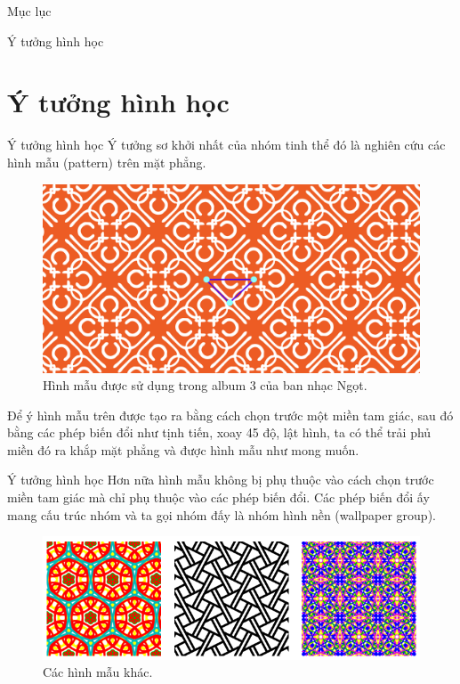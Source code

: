 


\begin{frame}
    \titlepage
\end{frame}

\begin{frame}{Mục lục}
    \tableofcontents
\end{frame}

\begin{frame}{Ý tưởng hình học}
    \section{Ý tưởng hình học}
\end{frame}

\begin{frame}{Ý tưởng hình học}
    Ý tưởng sơ khởi nhất của nhóm tinh thể đó là nghiên cứu các hình mẫu (pattern) trên mặt phẳng.

    \begin{figure}[ht]
        \centering
        \includegraphics[scale=0.3]{assets/ngot-band-pattern.png}
        \caption{Hình mẫu được sử dụng trong album 3 của ban nhạc Ngọt.}
        \label{fig:ngot-album-pattern}
    \end{figure}
    Để ý hình mẫu trên được tạo ra bằng cách chọn trước một miền tam giác, sau đó bằng các phép biến đổi như tịnh tiến, xoay 45 độ, lật hình, ta có thể trải phủ miền đó ra khắp mặt phẳng và được hình mẫu như mong muốn.
\end{frame}

\begin{frame}{Ý tưởng hình học}
    Hơn nữa hình mẫu không bị phụ thuộc vào cách chọn trước miền tam giác mà chỉ phụ thuộc vào các phép biến đổi. Các phép biến đổi ấy mang cấu trúc nhóm và ta gọi nhóm đấy là nhóm hình nền (wallpaper group).
    \begin{figure}[ht]
        \centering
        \includegraphics[scale=0.4]{assets/other-patterns.png}
        \caption{Các hình mẫu khác.}
        \label{fig:other-patterns}
    \end{figure}
\end{frame}

